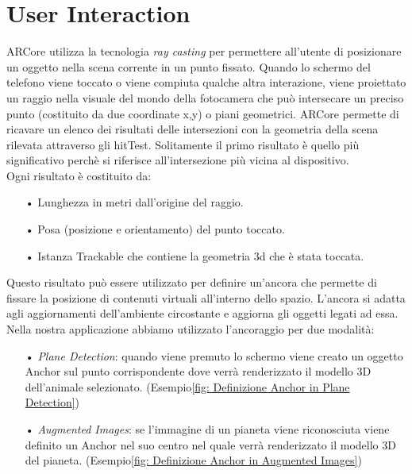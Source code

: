\documentclass[crop=false, class=book]{standalone}
\begin{document}
	\chapter{User Interaction}
	ARCore utilizza la tecnologia \textit{ray casting} per permettere all'utente di posizionare un oggetto nella scena corrente 	in un punto fissato. Quando lo schermo del telefono viene toccato o viene compiuta qualche altra interazione, 					viene proiettato un raggio nella visuale del mondo della fotocamera che può intersecare un preciso punto (costituito da 		due coordinate x,y) o piani geometrici. ARCore permette di ricavare un elenco dei risultati delle intersezioni con la 			geometria della scena rilevata attraverso gli hitTest. Solitamente il primo risultato è quello più significativo 				perchè si riferisce all'intersezione più vicina al dispositivo.\\
	Ogni risultato è costituito da:
	
	\begin{itemize}
		\item[•] Lunghezza in metri dall'origine del raggio.
		\item[•] Posa (posizione e orientamento) del punto toccato.
		\item[•] Istanza Trackable che contiene la geometria 3d che è stata toccata.
	\end{itemize}
	
	\begin{flushleft}
	Questo risultato può essere utilizzato per definire un'ancora che permette di fissare la posizione di 							contenuti virtuali all'interno dello spazio. L'ancora si adatta agli aggiornamenti dell'ambiente circostante e aggiorna gli 	oggetti legati ad essa.\\
	Nella nostra applicazione abbiamo utilizzato l'ancoraggio per due modalità: 
		\begin{itemize}
		\item[•] \emph{Plane Detection}: quando viene premuto lo schermo viene creato un oggetto Anchor sul punto corrispondente dove verrà renderizzato il modello 3D dell'animale selezionato. (Esempio\vref{fig: Definizione Anchor in Plane Detection})
		\item[•] \emph{Augmented Images}: se l'immagine di un pianeta viene riconosciuta viene definito un Anchor nel suo centro nel quale verrà renderizzato il modello 3D del pianeta. (Esempio\vref{fig: Definizione Anchor in Augmented Images})
	\end{itemize}
	\end{flushleft}
	
\end{document}
